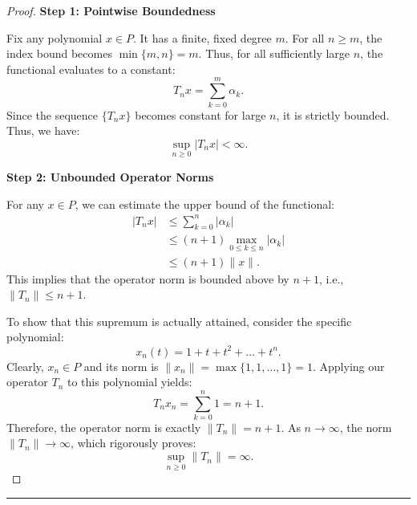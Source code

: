 \documentclass[11pt,a4paper]{article}
\theoremstyle{plain}
\theoremstyle{definition}
\begin{document}
\begin{proof}
    \textbf{Step 1: Pointwise Boundedness} \medskip

    Fix any polynomial $x \in P$. It has a finite, fixed degree $m$. For all \(n \ge m\), the index bound becomes $\min\{m,n\} = m$. Thus, for all sufficiently large $n$, the functional evaluates to a constant:
    \[
        T_n x = \sum_{k=0}^{m}\alpha_{k}.
    \]
    Since the sequence $\{T_n x\}$ becomes constant for large $n$, it is strictly bounded. Thus, we have:
    \[
        \sup_{n\ge 0}|T_{n}x| < \infty.
    \]

    \textbf{Step 2: Unbounded Operator Norms} \medskip

    For any $x \in P$, we can estimate the upper bound of the functional:
    \[
        \begin{aligned}
            |T_n x| & \le \sum_{k=0}^{n}|\alpha_k|            \\
                    & \le (n+1) \max_{0\le k\le n} |\alpha_k| \\
                    & \le (n+1)\|x\|.
        \end{aligned}
    \]
    This implies that the operator norm is bounded above by $n+1$, i.e., $\|T_n\| \le n+1$.

    To show that this supremum is actually attained, consider the specific polynomial:
    \[
        x_n(t) = 1 + t + t^2 + \dots + t^n.
    \]
    Clearly, $x_n \in P$ and its norm is $\|x_n\| = \max\{1, 1, \dots, 1\} = 1$.
    Applying our operator $T_n$ to this polynomial yields:
    \[
        T_n x_n = \sum_{k=0}^{n} 1 = n+1.
    \]
    Therefore, the operator norm is exactly $\|T_n\| = n+1$.
    As $n \to \infty$, the norm $\|T_n\| \to \infty$, which rigorously proves:
    \[
        \sup_{n\ge 0}\|T_{n}\| = \infty.
    \]
\end{proof}

\vspace{1.5em}
\hrule
\vspace{1.5em}
\end{document}
